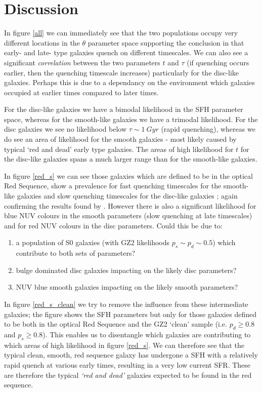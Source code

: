 \documentclass{mn2e}
\begin{document}
\section{Discussion}\label{diss}
In figure \ref{all} we can immediately see that the two populations occupy very different locations in the $\theta$ parameter space supporting the conclusion in \citet{Sch2014} that early- and late- type galaxies quench on different timescales. We can also see a significant \emph{correlation} between the two parameters $t$ and $\tau$ (if quenching occurs earlier, then the quenching timescale increases) particularly for the disc-like galaxies. Perhaps this is due to a dependancy on the environment which galaxies occupied at earlier times compared to later times. 

For the disc-like galaxies we have a bimodal likelihood in the SFH parameter space, whereas for the smooth-like galaxies we have a trimodal likelihood. For the disc galaxies we see no likelihood below $\tau \sim 1~Gyr$ (rapid quenching), whereas we do see an area of likelihood for the smooth galaxies - most likely caused by typical `red and dead' early type galaxies. The areas of high likelihood for $t$ for the disc-like galaxies spans a much larger range than for the smooth-like galaxies.

In figure \ref{red_s} we can see those galaxies which are defined to be in the optical Red Sequence, show a prevalence for fast quenching timescales for the smooth-like galaxies and slow quenching timescales for the disc-like galaxies ; again confirming the results found by \citet{Sch2014}. However there is also a significant likelihood for blue NUV colours in the smooth parameters (slow quenching at late timescales) and for red NUV colours in the disc parameters. Could this be due to:
\begin{enumerate}
\item a population of S0 galaxies (with GZ2 likelihoods $p_s \sim p_d \sim 0.5$) which contribute to both sets of parameters? 
\item bulge dominated disc galaxies impacting on the likely disc parameters?
\item NUV blue smooth galaxies impacting on the likely smooth parameters? 
\end{enumerate}
In figure \ref{red_s_clean} we try to remove the influence from these intermediate galaxies; the figure shows the SFH parameters but only for those galaxies defined to be both in the optical Red Sequence and the GZ2 `clean' sample (i.e. $p_d \geq 0.8$ and $p_s \geq 0.8$). This enables us to disentangle which galaxies are contributing to which areas of high likelihood in figure \ref{red_s}. We can therefore see that the typical clean, smooth, red sequence galaxy has undergone a SFH with a relatively rapid quench at various early times, resulting in a very low current SFR. These are therefore the typical \emph{`red and dead'} galaxies expected to be found in the red sequence. 
\end{document}
